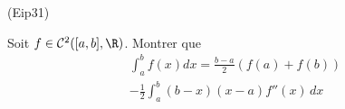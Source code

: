 \begin{tiny}(Eip31)\end{tiny} Soit $f \in \mathcal{C}^{2}([a,b],\R)$. Montrer que
\begin{multline*}
\int_{a}^{b}f(x)dx
=\frac{b-a}{2}\left( f(a)+f(b)\right) \\-\frac{1}{2}\int_{a}^{b}(b-x)(x-a)f''(x)\,dx 
\end{multline*}

